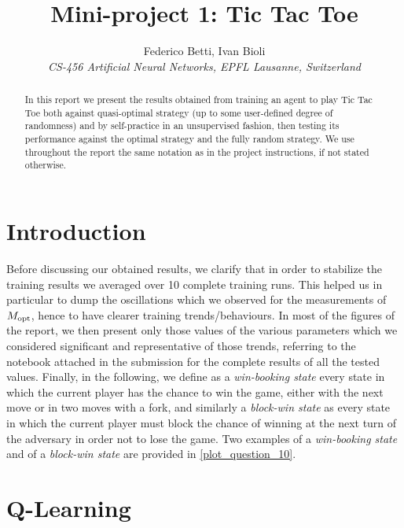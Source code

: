 \documentclass[10pt]{IEEEtran}
\begin{document}
\title{Mini-project 1: Tic Tac Toe}

\author{
   Federico Betti, Ivan Bioli\\
  \textit{CS-456 Artificial Neural Networks, EPFL Lausanne, Switzerland}
}


\maketitle

\begin{abstract}
In this report we present the results obtained from training an agent to play Tic Tac Toe both against quasi-optimal strategy (up to some user-defined degree of randomness) and by self-practice in an unsupervised fashion, then testing its performance against the optimal strategy and the fully random strategy. We use throughout the report the same notation as in the project instructions, if not stated otherwise.
\end{abstract}

\section{Introduction}
Before discussing our obtained results, we clarify that in order to stabilize the training results we averaged over 10 complete training runs. This helped us in particular to dump the oscillations which we observed for the measurements of $M_{\text{opt}}$, hence to have clearer training trends/behaviours. In most of the figures of the report, we then present only those values of the various parameters which we considered significant and representative of those trends, referring to the notebook attached in the submission for the complete results of all the tested values. Finally, in the following, we define as a \emph{win-booking state} every state in which the current player has the chance to win the game, either with the next move or in two moves with a fork, and similarly a \emph{block-win state} as every state in which the current player must block the chance of winning at the next turn of the adversary in order not to lose the game. Two examples of a \emph{win-booking state} and of a \emph{block-win state} are provided in \cref{plot_question_10}.

\section{Q-Learning}
\end{document}
